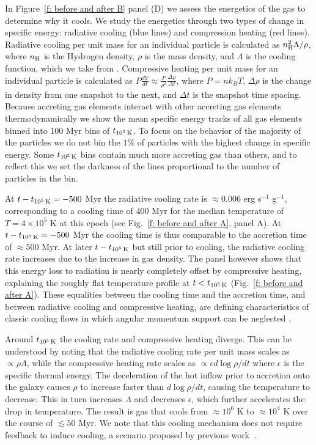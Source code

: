 \documentclass[fleqn,usenatbib]{mnras}
\newcommand{\tcon}{t_{10^5\,{\rm K}}}
\newcommand{\nH}{n_{\rm H}}
\begin{document}
In Figure~\ref{f: before and after B} panel (D) we assess the energetics of the gas to determine why it cools.
We study the energetics through two types of change in specific energy: radiative cooling (blue lines) and compression heating (red lines).
Radiative cooling per unit mass for an individual particle is calculated as $\nH^2 \Lambda / \rho$, where $\nH$ is the Hydrogen density, $\rho$ is the mass density, and $\Lambda$ is the cooling function, which we take from \cite{Wiersma2009a}.
Compressive heating per unit mass for an individual particle is calculated as $P \frac{dV}{dt} \approx \frac{ P }{ \rho^2 } \frac{ \Delta \rho }{ \Delta t }$, where $P = n k_B T$, $\Delta \rho$ is the change in density from one snapshot to the next, and $\Delta t$ is the snapshot time spacing.
Because accreting gas elements interact with other accreting gas elements thermodynamically we show the mean specific energy tracks of all gas elements binned into 100 Myr bins of $\tcon$.
To focus on the behavior of the majority of the particles we do not bin the $1\%$ of particles with the highest change in specific energy.
Some $\tcon$ bins contain much more accreting gas than others, and to reflect this we set the darkness of the lines proportional to the number of particles in the bin.

At $t-\tcon=-500$ Myr the radiative cooling rate is $\approx0.006$ erg s$^{-1}$ g$^{-1}$, corresponding to a cooling time of $400$ Myr for the median temperature of $T=4\times 10^5$ K at this epoch (see Fig.~\ref{f: before and after A}, panel A).
At $t-\tcon =-500$ Myr the cooling time is thus comparable to the accretion time of $\approx500$ Myr.
At later $t-\tcon$ but still prior to cooling, the radiative cooling rate increases due to the increase in gas density.
The panel however shows that this energy loss to radiation  is nearly completely offset by compressive heating, explaining the roughly flat temperature profile at $t<\tcon$ (Fig.~\ref{f: before and after A}). 
These equalities between the cooling time and the accretion time, and between radiative cooling and compressive heating, are defining characteristics of classic cooling flows in which angular momentum support can be neglected \citep{Mathews1978, McNamara2007, Stern2019}. 

Around $\tcon$ the cooling rate and compressive heating diverge.
This can be understood by noting that the radiative cooling rate per unit mass scales as $\propto\rho\Lambda$, while the compressive heating rate scales as $\propto\epsilon d\log\rho/d t$ where $\epsilon$ is the specific thermal energy.
The deceleration of the hot inflow prior to accretion onto the galaxy causes $\rho$ to increase faster than $d\log\rho/d t$, causing the temperature to decrease.
This in turn increases $\Lambda$ and decreases $\epsilon$, which further accelerates the drop in temperature.
The result is gas that cools from $\approx10^6$ K to $\approx10^4$ K over the course of $\lesssim 50$ Myr.
We note that this cooling mechanism does not require feedback to induce cooling, a scenario proposed by previous work~\citep{Marinacci2010, Marinacci2011, Armillotta2016, Fraternali2017, Hobbs2020}.
\end{document}
